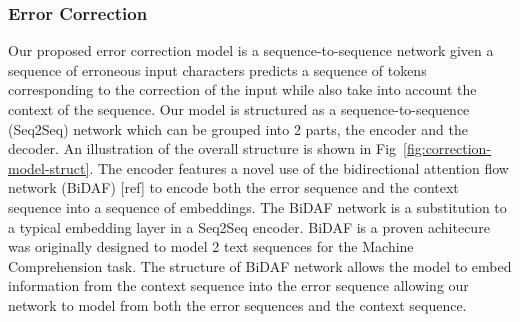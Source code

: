 \subsubsection{Error Correction}

Our proposed error correction model is a sequence-to-sequence network given a sequence of erroneous input characters predicts a sequence of tokens corresponding to the correction of the input while also take into account the context of the sequence. Our model is structured as a sequence-to-sequence (Seq2Seq) network which can be grouped into 2 parts, the encoder and the decoder. An illustration of the overall structure is shown in Fig~\ref{fig:correction-model-struct}. The encoder features a novel use of the bidirectional attention flow network (BiDAF) [ref] to encode both the error sequence and the context sequence into a sequence of embeddings. The BiDAF network is a substitution to a typical embedding layer in a Seq2Seq encoder. BiDAF is a proven achitecure was originally designed to model 2 text sequences for the Machine Comprehension task. The structure of BiDAF network allows the model to embed information from the context sequence into the error sequence allowing our network to model from both the error sequences and the context sequence.

